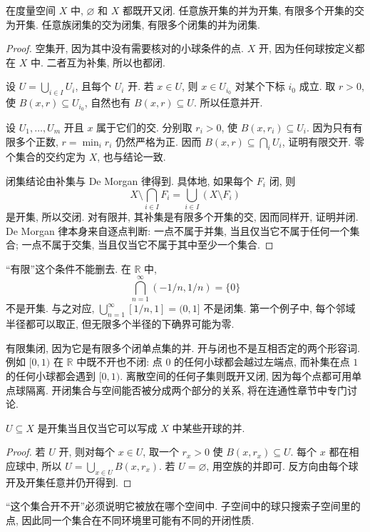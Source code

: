 \begin{theorem}[开闭集的集合运算]\label{ch:seq:operations}
在度量空间 $X$ 中, $\varnothing$ 和 $X$ 都既开又闭. 任意族开集的并为开集, 有限多个开集的交为开集. 任意族闭集的交为闭集, 有限多个闭集的并为闭集.
\end{theorem}
\begin{proof}
空集开, 因为其中没有需要核对的小球条件的点. $X$ 开, 因为任何球按定义都在 $X$ 中. 二者互为补集, 所以也都闭.

设 $U=\bigcup_{i\in I}U_i$, 且每个 $U_i$ 开. 若 $x\in U$, 则 $x\in U_{i_0}$ 对某个下标 $i_0$ 成立. 取 $r>0$, 使 $B(x,r)\subseteq U_{i_0}$, 自然也有 $B(x,r)\subseteq U$. 所以任意并开.

设 $U_1,\ldots,U_m$ 开且 $x$ 属于它们的交. 分别取 $r_i>0$, 使 $B(x,r_i)\subseteq U_i$. 因为只有有限多个正数, $r=\min_i r_i$ 仍然严格为正. 因而 $B(x,r)\subseteq\bigcap_iU_i$, 证明有限交开. 零个集合的交约定为 $X$, 也与结论一致.

闭集结论由补集与 De Morgan 律得到. 具体地, 如果每个 $F_i$ 闭, 则
\[
 X\setminus\bigcap_{i\in I}F_i
 =\bigcup_{i\in I}(X\setminus F_i)
\]
是开集, 所以交闭. 对有限并, 其补集是有限多个开集的交, 因而同样开, 证明并闭. De Morgan 律本身来自逐点判断: 一点不属于并集, 当且仅当它不属于任何一个集合; 一点不属于交集, 当且仅当它不属于其中至少一个集合.
\end{proof}
``有限''这个条件不能删去. 在 $\mathbb{R}$ 中,
\[
 \bigcap_{n=1}^\infty(-1/n,1/n)=\{0\}
\]
不是开集. 与之对应,
$\bigcup_{n=1}^\infty[1/n,1]=(0,1]$ 不是闭集. 第一个例子中, 每个邻域半径都可以取正, 但无限多个半径的下确界可能为零.

有限集闭, 因为它是有限多个闭单点集的并. 开与闭也不是互相否定的两个形容词. 例如 $[0,1)$ 在 $\mathbb{R}$ 中既不开也不闭: 点 $0$ 的任何小球都会越过左端点, 而补集在点 $1$ 的任何小球都会遇到 $[0,1)$. 离散空间的任何子集则既开又闭, 因为每个点都可用单点球隔离. 开闭集合与空间能否被分成两个部分的关系, 将在连通性章节中专门讨论.

\begin{proposition}[开集是球的并]\label{ch:seq:union-balls}
$U\subseteq X$ 是开集当且仅当它可以写成 $X$ 中某些开球的并.
\end{proposition}
\begin{proof}
若 $U$ 开, 则对每个 $x\in U$, 取一个 $r_x>0$ 使 $B(x,r_x)\subseteq U$. 每个 $x$ 都在相应球中, 所以 $U=\bigcup_{x\in U}B(x,r_x)$. 若 $U=\varnothing$, 用空族的并即可. 反方向由每个球开及开集任意并仍开得到.
\end{proof}

\label{ch:seq:subspaces}
``这个集合开不开''必须说明它被放在哪个空间中. 子空间中的球只搜索子空间里的点, 因此同一个集合在不同环境里可能有不同的开闭性质.

